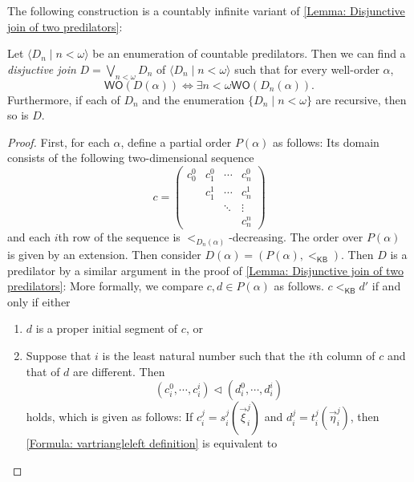 \documentclass{mhkr}
\newcommand{\lag}{\langle}
\newcommand{\rag}{\rangle}
\newcommand{\WO}{\mathsf{WO}}
\newcommand{\KB}{\mathsf{KB}}
\newcommand{\ACA}{\mathsf{ACA}}
\begin{document}
The following construction is a countably infinite variant of \autoref{Lemma: Disjunctive join of two predilators}:
\begin{lemma}[$\ACA_0$] \label{Lemma: Disjunctions of countably many predilators}
    Let $\lag D_n\mid n<\omega\rag$ be an enumeration of countable predilators. Then we can find a \emph{disjuctive join} $D=\bigvee_{n<\omega} D_n$ of $\lag D_n\mid n<\omega\rag$ such that for every well-order $\alpha$,
    \begin{equation*}
        \WO(D(\alpha))\iff \exists n<\omega \WO(D_n(\alpha)).
    \end{equation*}
    Furthermore, if each of $D_n$ and the enumeration $\{D_n\mid n<\omega\}$ are recursive, then so is $D$.
\end{lemma}
\begin{proof}
    First, for each $\alpha$, define a partial order $P(\alpha)$ as follows: Its domain consists of the following two-dimensional sequence
    \begin{equation*}
        c = 
        \begin{pmatrix}
            c^0_0 & c^0_1 & \cdots & c^0_n \\
            & c^1_1 & \cdots & c^1_n \\
            & & \ddots & \vdots \\
            & & & c^n_n
        \end{pmatrix}
    \end{equation*}
    and each $i$th row of the sequence is $<_{D_n(\alpha)}$-decreasing. The order over $P(\alpha)$ is given by an extension.
    Then consider $D(\alpha) = (P(\alpha),<_\mathsf{KB})$. Then $D$ is a predilator by a similar argument in the proof of \autoref{Lemma: Disjunctive join of two predilators}: 
    More formally, we compare $c,d\in P(\alpha)$ as follows. $c<_\KB d'$ if and only if either
    \begin{enumerate}
        \item $d$ is a proper initial segment of $c$, or
        \item Suppose that $i$ is the least natural number such that the $i$th column of $c$ and that of $d$ are different. Then 
        \begin{equation*} \label{Formula: vartriangleleft definition}
            (c^0_i,\cdots, c^i_i) \vartriangleleft (d^0_i,\cdots, d^i_i) 
        \end{equation*}
        holds, which is given as follows: If $c^j_i = s^j_i(\vec{\xi}^j_i)$ and $d^j_i = t^j_i(\vec{\eta}^j_i)$, then \eqref{Formula: vartriangleleft definition} is equivalent to

\end{enumerate}
\end{proof}
\end{document}

